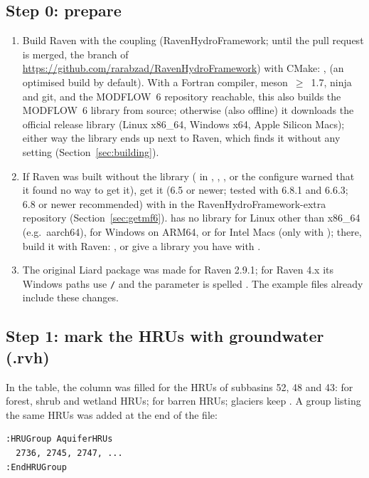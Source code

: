 \subsection{Step 0: prepare}
\begin{enumerate}
\item Build Raven with the coupling (RavenHydroFramework; until the pull request is merged, the  branch
of \url{https://github.com/rarabzad/RavenHydroFramework}) with CMake: ,  (an optimised  build by default). With a Fortran compiler, meson~$\geq$~1.7, ninja and git,
and the MODFLOW~6 repository reachable, this also builds the MODFLOW~6 library from source; otherwise (also offline) it
downloads the official release library (Linux x86\_64, Windows x64, Apple Silicon Macs); either
way the library ends up next to Raven, which finds it without any setting (Section~\ref{sec:building}).
\item If Raven was built without the library ( in , , , or
the configure warned that it found no way to get it), get it (6.5 or newer; tested with 6.8.1 and 6.6.3; 6.8 or newer
recommended) with  in the RavenHydroFramework-extra repository
(Section~\ref{sec:getmf6}).  has no library for Linux other than x86\_64 (e.g.\ aarch64), for Windows on
ARM64, or for Intel Macs (only with ); there, build it with Raven: , or give a library you have with .
\item The original Liard package was made for Raven 2.9.1; for Raven 4.x its Windows paths use \texttt{/} and the parameter
 is spelled . The example files already include these changes.
\end{enumerate}

\subsection{Step 1: mark the HRUs with groundwater (.rvh)}
In the  table, the  column was filled for the HRUs of subbasins 52, 48 and 43:
 for forest, shrub and wetland HRUs;  for barren HRUs; glaciers keep \cmd{[NONE]}.
A group listing the same HRUs was added at the end of the file:
\par\noindent\begin{minipage}{\linewidth}
\begin{lstlisting}
:HRUGroup AquiferHRUs
  2736, 2745, 2747, ...
:EndHRUGroup
\end{lstlisting}
\end{minipage}\par\smallskip

